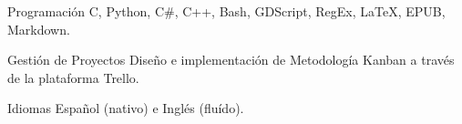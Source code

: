 

\begin{cvskills}

  \cvskill
    {Programación} %
    {C, Python, C\#, C++, Bash, GDScript, RegEx, LaTeX, EPUB, Markdown.} %

  \cvskill
    {Gestión de Proyectos} %
    {Diseño e implementación de Metodología Kanban a través de la plataforma Trello.} %

  \cvskill
    {Idiomas} %
    {Español (nativo) e Inglés (fluído).} %


\end{cvskills}
